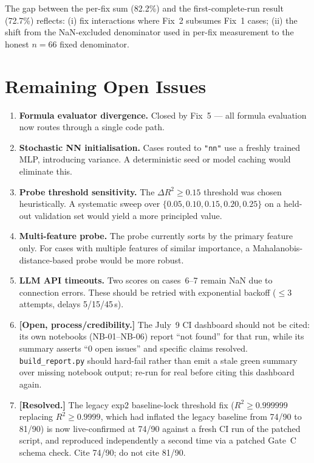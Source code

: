 \documentclass[twoside,11pt]{article}
\begin{document}
The gap between the per-fix sum (82.2\%) and the first-complete-run result
(72.7\%) reflects: (i) fix interactions where Fix~2 subsumes Fix~1 cases;
(ii) the shift from the NaN-excluded denominator used in per-fix measurement
to the honest $n{=}66$ fixed denominator.

\section{Remaining Open Issues}
\label{sec:open_issues}

\begin{enumerate}[leftmargin=*]
  \item \textbf{Formula evaluator divergence.}  Closed by Fix~5 — all formula
    evaluation now routes through a single code path.
  \item \textbf{Stochastic NN initialisation.}  Cases routed to \texttt{"nn"}
    use a freshly trained MLP, introducing variance.  A deterministic seed or
    model caching would eliminate this.
  \item \textbf{Probe threshold sensitivity.}  The $\Delta R^2 \geq 0.15$
    threshold was chosen heuristically.  A systematic sweep over
    $\{0.05, 0.10, 0.15, 0.20, 0.25\}$ on a held-out validation set would
    yield a more principled value.
  \item \textbf{Multi-feature probe.}  The probe currently sorts by the
    primary feature only.  For cases with multiple features of similar
    importance, a Mahalanobis-distance-based probe would be more robust.
  \item \textbf{LLM API timeouts.}  Two scores on cases~6--7 remain NaN
    due to connection errors.  These should be retried with exponential
    backoff ($\leq 3$ attempts, delays 5/15/45\,s).
  \item \textbf{[Open, process/credibility.]} The July~9 CI dashboard
    should not be cited: its own notebooks (NB-01--NB-06) report ``not
    found'' for that run, while its summary asserts ``0 open issues''
    and specific claims resolved. \texttt{build\_report.py} should
    hard-fail rather than emit a stale green summary over missing
    notebook output; re-run for real before citing this dashboard again.
  \item \textbf{[Resolved.]} The legacy exp2 baseline-lock
    threshold fix ($R^2 \geq 0.999999$ replacing $R^2 \geq 0.9999$, which
    had inflated the legacy baseline from 74/90 to 81/90) is now
    live-confirmed at 74/90 against a fresh CI run of the patched script,
    and reproduced independently a second time via a patched Gate~C
    schema check. Cite 74/90; do not cite 81/90.
\end{enumerate}
\end{document}
